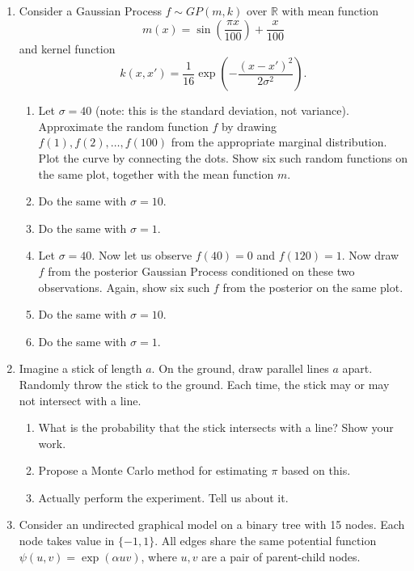 \documentclass{article}
\def\R{\mathbb R}
\begin{document}
\begin{enumerate}
\item 
Consider a Gaussian Process $f \sim GP(m,k)$ over $\R$ with mean function
$$m(x) = \sin(\frac{\pi x}{100}) + \frac{x}{100}$$
and kernel function
$$k(x,x') = \frac{1}{16}\exp\left( -\frac{(x-x')^2}{2\sigma^2} \right).$$
\begin{enumerate}
\item
Let $\sigma=40$ (note: this is the standard deviation, not variance).  Approximate the random function $f$ by drawing $f(1), f(2), \ldots, f(100)$ from the appropriate marginal distribution.  Plot the curve by connecting the dots.
Show six such random functions on the same plot, together with the mean function $m$.
\item Do the same with $\sigma=10$.
\item Do the same with $\sigma=1$.
\item
Let $\sigma=40$.
Now let us observe $f(40)=0$ and $f(120)=1$.
Now draw $f$ from the posterior Gaussian Process conditioned on these two observations.
Again, show six such $f$ from the posterior on the same plot.

\item Do the same with $\sigma=10$.
\item Do the same with $\sigma=1$.
\end{enumerate}


\item 
Imagine a stick of length $a$.  On the ground, draw parallel lines $a$ apart.
Randomly throw the stick to the ground.
Each time, the stick may or may not intersect with a line.
\begin{enumerate}
\item What is the probability that the stick intersects with a line?  Show your work.
\item Propose a Monte Carlo method for estimating $\pi$ based on this.  
\item Actually perform the experiment.  Tell us about it.
\end{enumerate}

\item 
Consider an undirected graphical model on a binary tree with 15 nodes.
Each node takes value in $\{-1,1\}$.
All edges share the same potential function $\psi(u,v) = \exp(\alpha u v)$, where $u,v$ are a pair of parent-child nodes.


\end{enumerate}
\end{document}

